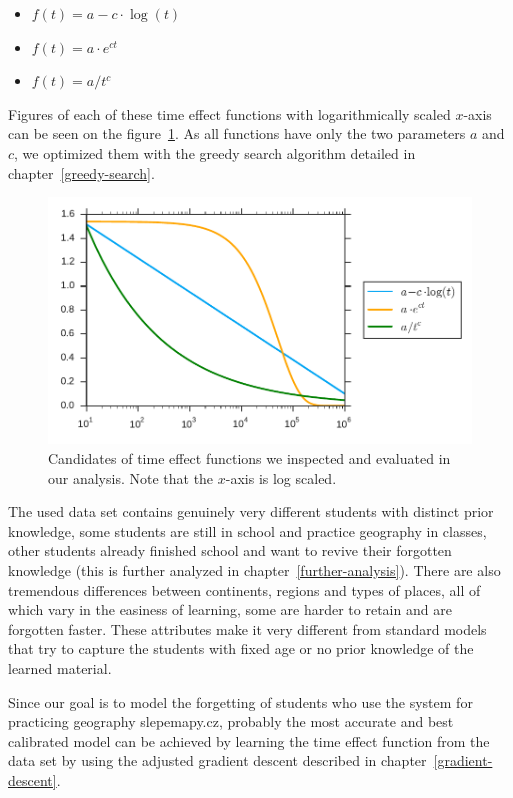 \begin{itemize}
  \item $f(t) = a - c \cdot \log(t)$
  \item $f(t) = a \cdot e^{c t}$
  \item $f(t) = a / t^c$
\end{itemize}

Figures of each of these time effect functions with logarithmically scaled $x$-axis can be seen on the figure~\ref{fig-time-effect-functions}. As all functions have only the two parameters $a$ and $c$, we optimized them with the greedy search algorithm detailed in chapter~\ref{greedy-search}.

\begin{figure}[htbp]
  \centering
  \includegraphics[width=\textwidth]{img/time-effect-functions}
  \caption{Candidates of time effect functions we inspected and evaluated in our analysis. Note that the $x$-axis is log scaled.}
  \label{fig-time-effect-functions}
\end{figure}

The used data set contains genuinely very different students with distinct prior knowledge, some students are still in school and practice geography in classes, other students already finished school and want to revive their forgotten knowledge (this is further analyzed in chapter~\ref{further-analysis}). There are also tremendous differences between continents, regions and types of places, all of which vary in the easiness of learning, some are harder to retain and are forgotten faster. These attributes make it very different from standard models that try to capture the students with fixed age or no prior knowledge of the learned material.

Since our goal is to model the forgetting of students who use the system for practicing geography slepemapy.cz, probably the most accurate and best calibrated model can be achieved by learning the time effect function from the data set by using the adjusted gradient descent described in chapter~\ref{gradient-descent}.

